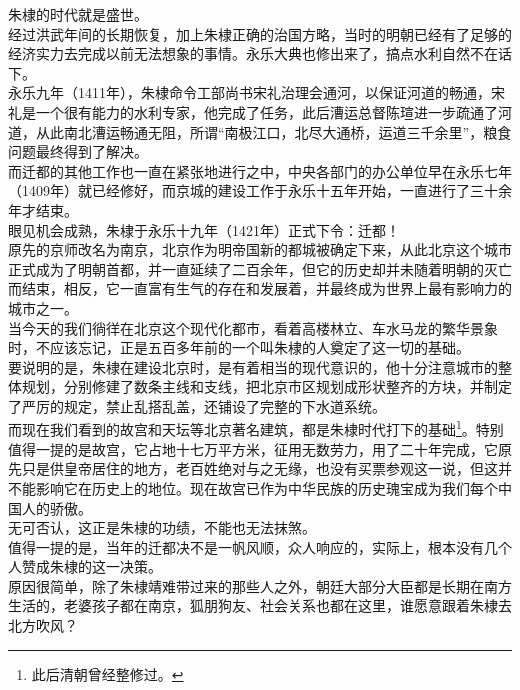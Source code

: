 \begin{multicols}{\theparacolNo}
朱棣的时代就是盛世。\\

经过洪武年间的长期恢复，加上朱棣正确的治国方略，当时的明朝已经有了足够的经济实力去完成以前无法想象的事情。永乐大典也修出来了，搞点水利自然不在话下。\\

永乐九年（1411年），朱棣命令工部尚书宋礼治理会通河，以保证河道的畅通，宋礼是一个很有能力的水利专家，他完成了任务，此后漕运总督陈瑄进一步疏通了河道，从此南北漕运畅通无阻，所谓“南极江口，北尽大通桥，运道三千余里”，粮食问题最终得到了解决。\\

而迁都的其他工作也一直在紧张地进行之中，中央各部门的办公单位早在永乐七年（1409年）就已经修好，而京城的建设工作于永乐十五年开始，一直进行了三十余年才结束。\\

眼见机会成熟，朱棣于永乐十九年（1421年）正式下令：迁都！\\

原先的京师改名为南京，北京作为明帝国新的都城被确定下来，从此北京这个城市正式成为了明朝首都，并一直延续了二百余年，但它的历史却并未随着明朝的灭亡而结束，相反，它一直富有生气的存在和发展着，并最终成为世界上最有影响力的城市之一。\\

当今天的我们徜徉在北京这个现代化都市，看着高楼林立、车水马龙的繁华景象时，不应该忘记，正是五百多年前的一个叫朱棣的人奠定了这一切的基础。\\

要说明的是，朱棣在建设北京时，是有着相当的现代意识的，他十分注意城市的整体规划，分别修建了数条主线和支线，把北京市区规划成形状整齐的方块，并制定了严厉的规定，禁止乱搭乱盖，还铺设了完整的下水道系统。\\

而现在我们看到的故宫和天坛等北京著名建筑，都是朱棣时代打下的基础\footnote{此后清朝曾经整修过。}。特别值得一提的是故宫，它占地十七万平方米，征用无数劳力，用了二十年完成，它原先只是供皇帝居住的地方，老百姓绝对与之无缘，也没有买票参观这一说，但这并不能影响它在历史上的地位。现在故宫已作为中华民族的历史瑰宝成为我们每个中国人的骄傲。\\

无可否认，这正是朱棣的功绩，不能也无法抹煞。\\

值得一提的是，当年的迁都决不是一帆风顺，众人响应的，实际上，根本没有几个人赞成朱棣的这一决策。\\

原因很简单，除了朱棣靖难带过来的那些人之外，朝廷大部分大臣都是长期在南方生活的，老婆孩子都在南京，狐朋狗友、社会关系也都在这里，谁愿意跟着朱棣去北方吹风？\\


\end{multicols}

